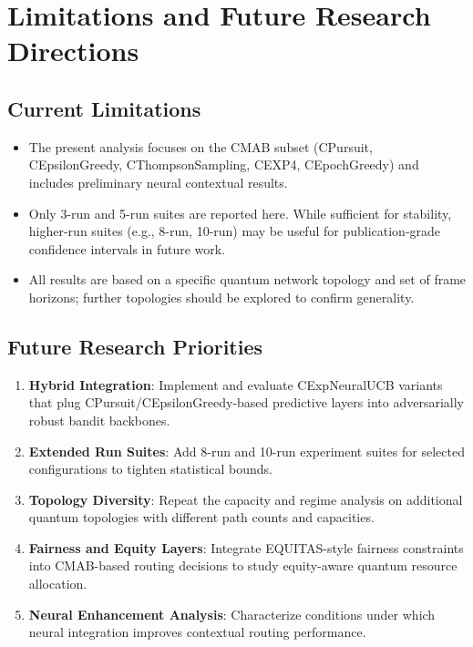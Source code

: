 \documentclass[12pt,a4paper]{article}
\begin{document}
\section{Limitations and Future Research Directions}

\subsection{Current Limitations}

\begin{itemize}
\item The present analysis focuses on the CMAB subset (CPursuit, CEpsilonGreedy, CThompsonSampling, CEXP4, CEpochGreedy) and includes preliminary neural contextual results.
\item Only 3-run and 5-run suites are reported here. While sufficient for stability, higher-run suites (e.g., 8-run, 10-run) may be useful for publication-grade confidence intervals in future work.
\item All results are based on a specific quantum network topology and set of frame horizons; further topologies should be explored to confirm generality.
\end{itemize}

\subsection{Future Research Priorities}

\begin{enumerate}
\item \textbf{Hybrid Integration}: Implement and evaluate CExpNeuralUCB variants that plug CPursuit/CEpsilonGreedy-based predictive layers into adversarially robust bandit backbones.
\item \textbf{Extended Run Suites}: Add 8-run and 10-run experiment suites for selected configurations to tighten statistical bounds.
\item \textbf{Topology Diversity}: Repeat the capacity and regime analysis on additional quantum topologies with different path counts and capacities.
\item \textbf{Fairness and Equity Layers}: Integrate EQUITAS-style fairness constraints into CMAB-based routing decisions to study equity-aware quantum resource allocation.
\item \textbf{Neural Enhancement Analysis}: Characterize conditions under which neural integration improves contextual routing performance.
\end{enumerate}
\end{document}

